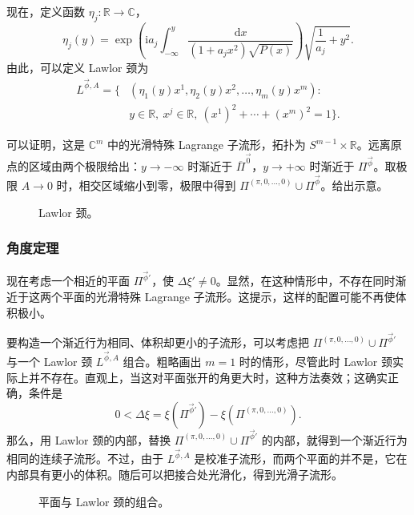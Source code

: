 现在，定义函数 $\eta_j\colon\mathbb{R}\to\mathbb{C}$，
\begin{equation}\label{eq:5.27}
\eta_j(y)=\exp\!\left(\mathrm{i}a_j\int_{-\infty}^y
\frac{\mathrm{d}x}{(1+a_jx^2)\sqrt{P(x)}}\right)
\sqrt{\frac{1}{a_j}+y^2}.
\end{equation}
由此，可以定义 Lawlor 颈为
\begin{equation}\label{eq:5.28}
\begin{aligned}
L^{\vec\phi,A}=\bigl\{& (\eta_1(y)x^1,\eta_2(y)x^2,\ldots,\eta_m(y)x^m):\\
&y\in\mathbb{R},\ x^j\in\mathbb{R},\ (x^1)^2+\cdots+(x^m)^2=1\bigr\}.
\end{aligned}
\end{equation}

可以证明，这是 $\mathbb{C}^m$ 中的光滑特殊 Lagrange 子流形，拓扑为 $S^{m-1}\times\mathbb{R}$。远离原点的区域由两个极限给出：$y\to-\infty$ 时渐近于 $\overline\Pi^{\vec0}$，$y\to+\infty$ 时渐近于 $\Pi^{\vec\phi}$。取极限 $A\to0$ 时，相交区域缩小到零，极限中得到 $\Pi^{(\pi,0,\ldots,0)}\cup\Pi^{\vec\phi}$。给出示意。
\begin{figure}[H]
\centering
{}
\caption{Lawlor 颈。}\label{fig:5.1}
\end{figure}

\subsubsection{角度定理}\label{sec:5.2.1.5}

现在考虑一个相近的平面 $\Pi^{\vec\phi'}$，使 $\Delta\xi'\ne0$。显然，在这种情形中，不存在同时渐近于这两个平面的光滑特殊 Lagrange 子流形。这提示，这样的配置可能不再使体积极小。

要构造一个渐近行为相同、体积却更小的子流形，可以考虑把 $\Pi^{(\pi,0,\ldots,0)}\cup\Pi^{\vec\phi'}$ 与一个 Lawlor 颈 $L^{\vec\phi,A}$ 组合。粗略画出 $m=1$ 时的情形，尽管此时 Lawlor 颈实际上并不存在。直观上，当这对平面张开的角更大时，这种方法奏效；这确实正确，条件是
\begin{equation}\label{eq:5.29}
0<\Delta\xi=\xi(\Pi^{\vec\phi'})-\xi(\Pi^{(\pi,0,\ldots,0)}).
\end{equation}
那么，用 Lawlor 颈的内部，替换 $\Pi^{(\pi,0,\ldots,0)}\cup\Pi^{\vec\phi'}$ 的内部，就得到一个渐近行为相同的连续子流形。不过，由于 $L^{\vec\phi,A}$ 是校准子流形，而两个平面的并不是，它在内部具有更小的体积。随后可以把接合处光滑化，得到光滑子流形。
\begin{figure}[H]
\centering
{}
\caption{平面与 Lawlor 颈的组合。}\label{fig:5.2}
\end{figure}

